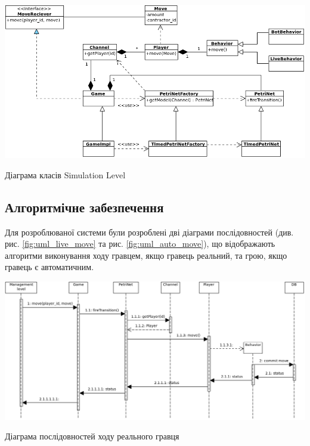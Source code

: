 \begin{stdfigure}
    \includegraphics[width=7in]{images/uml/simulation_level.png}
    \caption{Діаграма класів Simulation Level}
    \label{fig:uml_simulation}
\end{stdfigure}   

\subsection{Алгоритмічне забезпечення}
Для розроблюваної системи були розроблені дві діаграми послідовностей (див. рис. \ref{fig:uml_live_move} та рис. \ref{fig:uml_auto_move}), що відображають алгоритми виконування ходу гравцем, якщо гравець реальний, та грою, якщо гравець є автоматичним.
\begin{stdfigure}
    \includegraphics[width=7in]{images/uml/live_move.png}
    \caption{Діаграма послідовностей ходу реального гравця}
    \label{fig:uml_live_move}
\end{stdfigure}   

